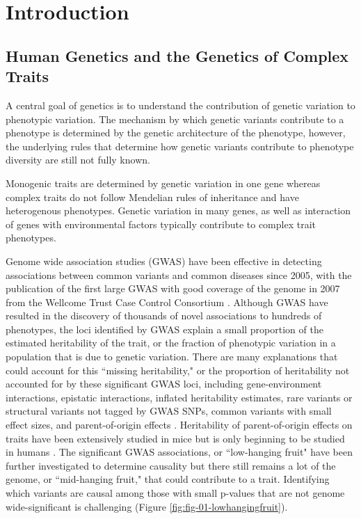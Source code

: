 
\chapter{Introduction}

\section{Human Genetics and the Genetics of Complex Traits}

A central goal of genetics is to understand the contribution of genetic variation to phenotypic variation. The mechanism by which genetic variants contribute to a phenotype is determined by the genetic architecture of the phenotype, however, the underlying rules that determine how genetic variants contribute to phenotype diversity are still not fully known. 

Monogenic traits are determined by genetic variation in one gene whereas complex traits do not follow Mendelian rules of inheritance and have heterogenous phenotypes. Genetic variation in many genes, as well as interaction of genes with environmental factors typically contribute to complex trait phenotypes. 

Genome wide association studies (GWAS) have been effective in detecting associations between common variants and common diseases since 2005, with the publication of the first large GWAS with good coverage of the genome in 2007 from the Wellcome Trust Case Control Consortium \cite{WellcomeTrustCaseControlConsortium:2007do}. Although GWAS have resulted in the discovery of thousands of novel associations to hundreds of phenotypes, the loci identified by GWAS explain a small proportion of the estimated heritability of the trait, or the fraction of phenotypic variation in a population that is due to genetic variation. There are many explanations that could account for this ``missing heritability," or the proportion of heritability not accounted for by these significant GWAS loci, including gene-environment interactions, epistatic interactions, inflated heritability estimates, rare variants or structural variants not tagged by GWAS SNPs, common variants with small effect sizes, and parent-of-origin effects \cite{Zaitlen2013,Eichler:2010kd,Gibson:2012kc,Zuk:cc}. Heritability of parent-of-origin effects on traits have been extensively studied in mice \cite{Babak2008,Mott2014,Babak2015,Babak2012} but is only beginning to be studied in humans \cite{Laurin:2017jv}. The significant GWAS associations, or ``low-hanging fruit" have been further investigated to determine causality but there still remains a lot of the genome, or ``mid-hanging fruit," that could contribute to a trait. Identifying which variants are causal among those with small p-values that are not genome wide-significant is challenging (Figure \ref{fig:fig-01-lowhangingfruit}).

